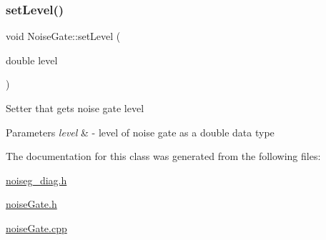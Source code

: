 \mbox{\label{classNoiseGate_aa03603d23e350f5d9d1e0914de862f57}} 
\subsubsection{\texorpdfstring{set\+Level()}{setLevel()}}
{\footnotesize\ttfamily void Noise\+Gate\+::set\+Level (\begin{DoxyParamCaption}\item[{double}]{level }\end{DoxyParamCaption})}

Setter that gets noise gate level 
\begin{DoxyParams}{Parameters}
{\em level} & -\/ level of noise gate as a double data type \\
\hline
\end{DoxyParams}


The documentation for this class was generated from the following files\+:\begin{DoxyCompactItemize}
\item 
\hyperlink{noiseg__diag_8h}{noiseg\+\_\+diag.\+h}\item 
\hyperlink{noiseGate_8h}{noise\+Gate.\+h}\item 
\hyperlink{noiseGate_8cpp}{noise\+Gate.\+cpp}\end{DoxyCompactItemize}
